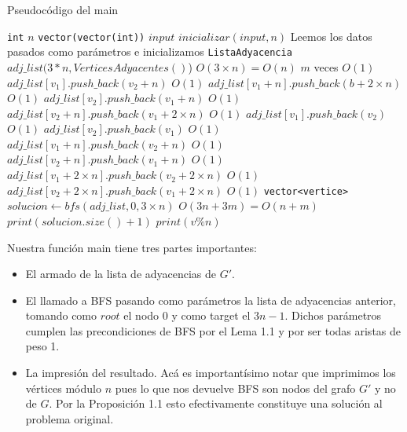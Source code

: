 \begin{algorithm}[H]
  \begin{algorithmic}[1]
  \caption{Pseudocódigo del main}
  \label{algo:1-2}
    	\State \texttt{int} $n$
    	\State \texttt{vector(vector(int))} $input$
    	\normalsize
    	\State $inicializar(input, n)$
    	\Comment \small Leemos los datos pasados como parámetros e inicializamos \normalsize
    	\State \texttt{ListaAdyacencia} $adj\_list(3*n, VerticesAdyacentes()$)
    	\Comment $O(3\times n) = O(n)$
    	\Comment $m$ veces
    		\Comment $O(1)$
    			\State $adj\_list[v_1].push\_back(v_2 + n)$
    			\Comment $O(1)$
    			\State $adj\_list[v_1 + n].push\_back(b + 2\times n)$
    			\Comment $O(1)$
    			\State $adj\_list[v_2].push\_back(v_1 + n)$
    			\Comment $O(1)$
    			\State $adj\_list[v_2 + n].push\_back(v_1 + 2\times n)$
    			\Comment $O(1)$
    		\Else
     			\State $adj\_list[v_1].push\_back(v_2)$
     			\Comment $O(1)$
     			\State $adj\_list[v_2].push\_back(v_1)$
     			\Comment $O(1)$
     			\State $adj\_list[v_1 + n].push\_back(v_2 + n)$
     			\Comment $O(1)$
     			\State $adj\_list[v_2 + n].push\_back(v_1 + n)$
     			\Comment $O(1)$
    		\EndIf
    		\State $adj\_list[v_1 + 2\times n].push\_back(v_2 + 2\times n)$
    		\Comment $O(1)$
    		\State $adj\_list[v_2 + 2\times n].push\_back(v_1 + 2\times n)$
    		\Comment $O(1)$
    	\EndFor
    	\State \texttt{vector<vertice>} $solucion\gets bfs(adj\_list, 0, 3\times n)$
    	\Comment $O(3n + 3m) = O(n + m)$
    	\State $print(solucion.size() + 1)$
    		\State $print(v \% n)$
    	\EndFor
		\EndProcedure
  \end{algorithmic}
  \end{algorithm}

Nuestra función main tiene tres partes importantes:
\begin{itemize}
	\item El armado de la lista de adyacencias de $G'$.
	\item El llamado a BFS pasando como parámetros la lista de adyacencias anterior, tomando como $root$ el nodo $0$ y como target el $3n-1$. Dichos parámetros cumplen las precondiciones de BFS por el Lema 1.1 y por ser todas aristas de peso 1.
	\item La impresión del resultado. Acá es importantísimo notar que imprimimos los vértices módulo $n$ pues lo que nos devuelve BFS son nodos del grafo $G'$ y no de $G$. Por la Proposición 1.1 esto efectivamente constituye una solución al problema original.
\end{itemize}


